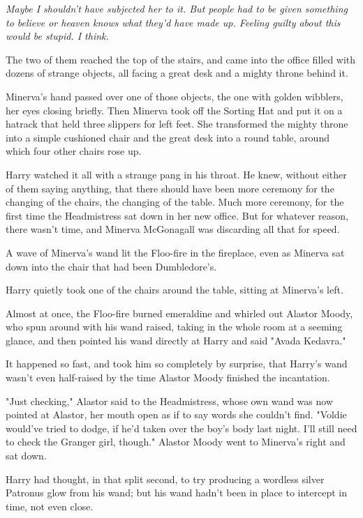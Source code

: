 \emph{Maybe I shouldn't have subjected her to it. But people had to be given
\emph{something} to believe or heaven knows what they'd have made up. Feeling
guilty about this would be stupid. I think.}

The two of them reached the top of the stairs, and came into the office filled
with dozens of strange objects, all facing a great desk and a mighty throne
behind it.

Minerva's hand passed over one of those objects, the one with golden wibblers,
her eyes closing briefly. Then Minerva took off the Sorting Hat and put it on a
hatrack that held three slippers for left feet. She transformed the mighty
throne into a simple cushioned chair and the great desk into a round table,
around which four other chairs rose up.

Harry watched it all with a strange pang in his throat. He knew, without either
of them saying anything, that there should have been more ceremony for the
changing of the chairs, the changing of the table. Much more ceremony, for the
first time the Headmistress sat down in her new office. But for whatever
reason, there wasn't time, and Minerva McGonagall was discarding all that for
speed.

A wave of Minerva's wand lit the Floo-fire in the fireplace, even as Minerva
sat down into the chair that had been Dumbledore's.

Harry quietly took one of the chairs around the table, sitting at Minerva's
left.

Almost at once, the Floo-fire burned emeraldine and whirled out Alastor Moody,
who spun around with his wand raised, taking in the whole room at a seeming
glance, and then pointed his wand directly at Harry and said "Avada Kedavra."

It happened so fast, and took him so completely by surprise, that Harry's wand
wasn't even half-raised by the time Alastor Moody finished the incantation.

"Just checking," Alastor said to the Headmistress, whose own wand was now
pointed at Alastor, her mouth open as if to say words she couldn't find.
"Voldie would've tried to dodge, if he'd taken over the boy's body last night.
I'll still need to check the Granger girl, though." Alastor Moody went to
Minerva's right and sat down.

Harry had thought, in that split second, to try producing a wordless silver
Patronus glow from his wand; but his wand hadn't been in place to intercept in
time, not even close.

